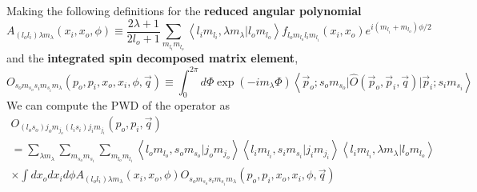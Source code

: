 \documentclass[onecolumn]{revtex4-2}
\begin{document}
Making the following definitions for the \textbf{reduced angular polynomial}
\begin{equation}\label{def:red-ang}
    A_{(l_o l_i)\lambda m_\lambda}(x_i, x_o, \phi)
    \equiv
    \frac{2 \lambda +1}{2 l_o + 1}
    \sum_{m_{l_i}m_{l_o}}
    \left\langle
        l_i m_{l_i}, \lambda m_{\lambda} \big\vert l_o m_{l_o}
    \right\rangle
    f_{l_o m_{l_o} l_i m_{l_i}} (x_i, x_o)
    e^{i (m_{l_i} +  m_{l_o}) \phi/2}
\end{equation}
and the \textbf{integrated spin decomposed matrix element},
\begin{equation}
    \label{def:integrated-spin-pwd}
    O_{s_o m_{s_o} s_i m_{s_i} m_\lambda}(p_o, p_i, x_o, x_i, \phi, \vec q)
    \equiv
    \int_{0}^{2\pi} d \Phi \exp\left(-i m_\lambda \Phi\right)
    \left\langle
        \vec p_o; s_o m_{s_o}
        \big\vert
        \hat O(\vec p_o, \vec p_i, \vec q)
        \big\vert
        \vec p_i; s_i m_{s_i}
    \right\rangle
\end{equation}
We can compute the PWD of the operator as
\begin{multline}\label{def:pwd}
    O_{(l_o s_o)j_o m_{j_o} (l_i s_i)j_i m_{j_i}}(p_o, p_i, \vec{q})
    \\ =
    \sum\limits_{\lambda m_\lambda}
    \sum\limits_{m_{s_o} m_{s_i}}
    \sum\limits_{m_{l_o} m_{l_i}}
    \left\langle
        l_o m_{l_o}, s_o m_{s_o} \big\vert j_o m_{j_o}
    \right\rangle
    \left\langle
        l_i m_{l_i}, s_i m_{s_i} \big\vert j_i m_{j_i}
    \right\rangle
    \left\langle
        l_i m_{l_i}, \lambda m_{\lambda} \big\vert l_o m_{l_o}
    \right\rangle
    \\ \times
    \int d x_o d x_i d \phi
    A_{(l_o l_i)\lambda m_\lambda}(x_i, x_o, \phi)
    O_{s_o m_{s_o} s_i m_{s_i} m_\lambda}(p_o, p_i, x_o, x_i, \phi, \vec q)
\end{multline}
\end{document}
